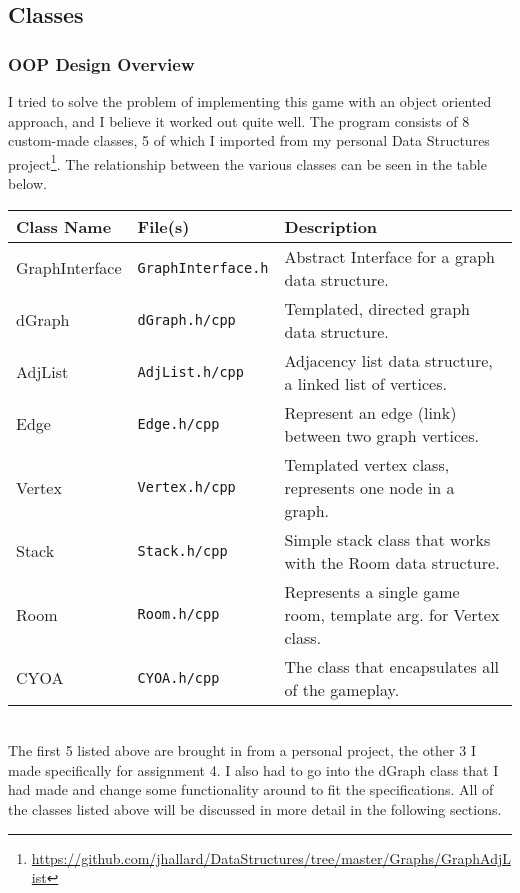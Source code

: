 \documentclass[a4paper,11pt]{article}
\begin{document}
    \subsection{Classes}

    \subsubsection{OOP Design Overview}
    I tried to solve the problem of implementing this game with an object oriented approach, and I believe it worked out quite well. The program consists of 8 custom-made classes, 5 of which I imported from my personal Data Structures project\footnote{\url{https://github.com/jhallard/DataStructures/tree/master/Graphs/GraphAdjList}}. The relationship between the various classes can be seen in the table below. \\

    \begin{tabular}{l | l || l}
    Class Name     & File(s)                   & Description \\ \hline
    GraphInterface & \texttt{GraphInterface.h} & \small{Abstract Interface for a graph data structure.} \\
    dGraph         & \texttt{dGraph.h/cpp}     & \small{Templated, directed graph data structure.}                           \\
    AdjList        & \texttt{AdjList.h/cpp}    & \small{Adjacency list data structure, a linked list of vertices.}  \\
    Edge           & \texttt{Edge.h/cpp}       & \small{Represent an edge (link) between two graph vertices.} \\
    Vertex         & \texttt{Vertex.h/cpp}     & \small{Templated vertex class, represents one node in a graph.} \\
    Stack          & \texttt{Stack.h/cpp}      & \small{Simple stack class that works with the Room data structure.} \\
    Room           & \texttt{Room.h/cpp}       & \small{Represents a single game room, template arg. for Vertex class.} \\
    CYOA           & \texttt{CYOA.h/cpp}       & \small{The class that encapsulates all of the gameplay.} 
    \end{tabular} \\

    The first 5 listed above are brought in from a personal project, the other 3 I made specifically for assignment 4. I also had to go into the dGraph class that I had made and change some functionality around to fit the specifications. All of the classes listed above will be discussed in more detail in the following sections.
\end{document}
